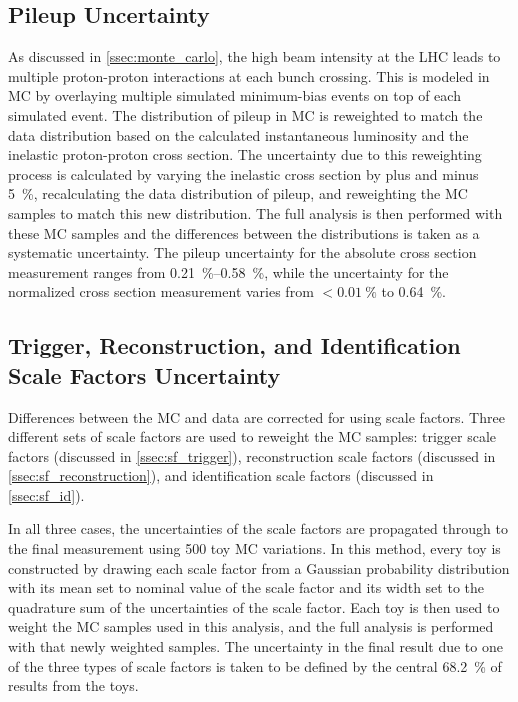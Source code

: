 \subsection{Pileup Uncertainty}
\label{ssec:pileup_uncertainty}

As discussed in \cref{ssec:monte_carlo}, the high beam intensity at the LHC
leads to multiple proton-proton interactions at each bunch crossing. This is
modeled in MC by overlaying multiple simulated minimum-bias events on top of
each simulated event. The distribution of pileup in MC is reweighted to match
the data distribution based on the calculated instantaneous luminosity and the
inelastic proton-proton cross section. The uncertainty due to this reweighting
process is calculated by varying the inelastic cross section by plus and minus
\SI{5}{\percent}, recalculating the data distribution of pileup, and
reweighting the MC samples to match this new distribution. The full analysis is
then performed with these MC samples and the differences between the \phistar
distributions is taken as a systematic uncertainty. The pileup uncertainty for
the absolute cross section measurement ranges from
\SIrange{0.21}{0.58}{\percent}, while the uncertainty for the normalized cross
section measurement varies from $< \SI{0.01}{\percent}$ to \SI{0.64}{\percent}.

\subsection{Trigger, Reconstruction, and Identification Scale Factors Uncertainty}
\label{scale_factor_uncertainty}

Differences between the MC and data are corrected for using scale factors.
Three different sets of scale factors are used to reweight the MC samples:
trigger scale factors (discussed in \cref{ssec:sf_trigger}), reconstruction
scale factors (discussed in \cref{ssec:sf_reconstruction}), and
identification scale factors (discussed in \cref{ssec:sf_id}).

In all three cases, the uncertainties of the scale factors are propagated
through to the final measurement using 500 toy MC variations. In this method,
every toy is constructed by drawing each scale factor from a Gaussian
probability distribution with its mean set to nominal value of the scale factor
and its width set to the quadrature sum of the uncertainties of the scale
factor. Each toy is then used to weight the MC samples used in this analysis,
and the full analysis is performed with that newly weighted samples. The
uncertainty in the final result due to one of the three types of scale factors
is taken to be defined by the central \SI{68.2}{\percent} of results from the
toys.

